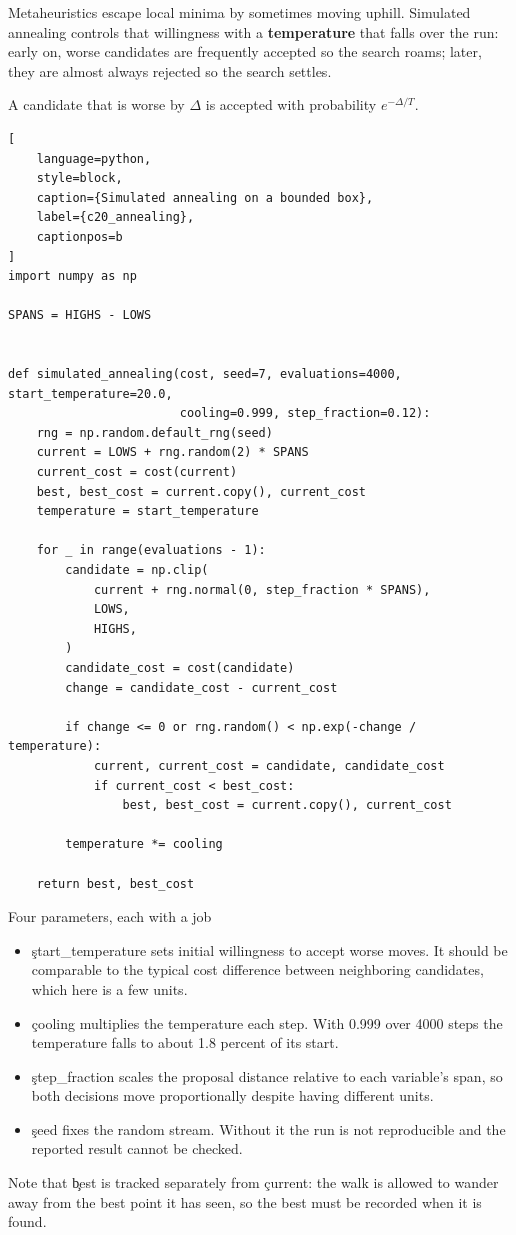 
Metaheuristics escape local minima by sometimes moving uphill. Simulated
annealing controls that willingness with a \textbf{temperature} that falls over
the run: early on, worse candidates are frequently accepted so the search roams;
later, they are almost always rejected so the search settles.

A candidate that is worse by $\Delta$ is accepted with probability
$e^{-\Delta / T}$.

\begin{lstlisting}[
    language=python,
    style=block,
    caption={Simulated annealing on a bounded box},
    label={c20_annealing},
    captionpos=b
]
import numpy as np

SPANS = HIGHS - LOWS


def simulated_annealing(cost, seed=7, evaluations=4000, start_temperature=20.0,
                        cooling=0.999, step_fraction=0.12):
    rng = np.random.default_rng(seed)
    current = LOWS + rng.random(2) * SPANS
    current_cost = cost(current)
    best, best_cost = current.copy(), current_cost
    temperature = start_temperature

    for _ in range(evaluations - 1):
        candidate = np.clip(
            current + rng.normal(0, step_fraction * SPANS),
            LOWS,
            HIGHS,
        )
        candidate_cost = cost(candidate)
        change = candidate_cost - current_cost

        if change <= 0 or rng.random() < np.exp(-change / temperature):
            current, current_cost = candidate, candidate_cost
            if current_cost < best_cost:
                best, best_cost = current.copy(), current_cost

        temperature *= cooling

    return best, best_cost
\end{lstlisting}

\begin{SyntaxBox}{Four parameters, each with a job}
\begin{itemize}
    \item \c{start_temperature} sets initial willingness to accept worse moves.
          It should be comparable to the typical cost difference between
          neighboring candidates, which here is a few units.
    \item \c{cooling} multiplies the temperature each step. With 0.999 over 4000
          steps the temperature falls to about 1.8 percent of its start.
    \item \c{step_fraction} scales the proposal distance relative to each
          variable's span, so both decisions move proportionally despite having
          different units.
    \item \c{seed} fixes the random stream. Without it the run is not
          reproducible and the reported result cannot be checked.
\end{itemize}
Note that \c{best} is tracked separately from \c{current}: the walk is allowed
to wander away from the best point it has seen, so the best must be recorded
when it is found.
\end{SyntaxBox}

